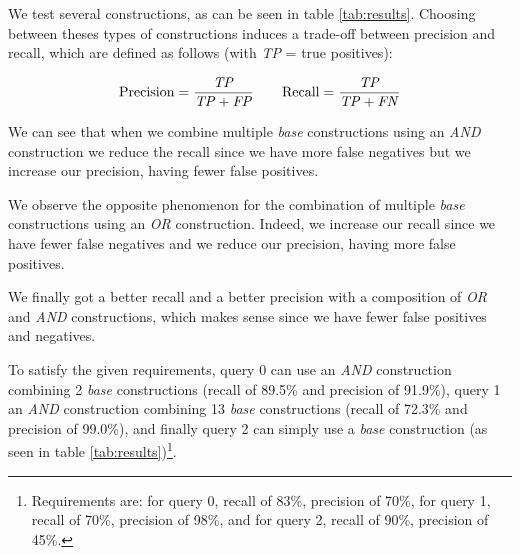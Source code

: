 \documentclass[a4paper,10pt]{IEEEtran}
\begin{document}
We test several constructions, as can be seen in table \ref{tab:results}.
Choosing between theses types of constructions induces a trade-off between precision and recall, which are defined as follows (with \textit{TP} = true positives):

\[
    \textrm{Precision} = \frac{\textrm{\textit{TP}}}{\textrm{\textit{TP}} + \textrm{\textit{FP}}} \quad\quad
    \textrm{Recall} = \frac{\textrm{\textit{TP}}}{\textrm{\textit{TP}} + \textrm{\textit{FN}}}
\]

We can see that when we combine multiple \textit{base} constructions using an \textit{AND} construction we reduce the recall since we have more false negatives but we increase our precision, having fewer false positives.

We observe the opposite phenomenon for the combination of multiple \textit{base} constructions using an \textit{OR} construction.
Indeed, we increase our recall since we have fewer false negatives and we reduce our precision, having more false positives.

We finally got a better recall and a better precision with a composition of \textit{OR} and \textit{AND} constructions, which makes sense since we have fewer false positives and negatives.

To satisfy the given requirements, query 0 can use an \textit{AND} construction combining 2 \textit{base} constructions (recall of 89.5\% and precision of 91.9\%), query 1 an \textit{AND} construction combining 13 \textit{base} constructions (recall of 72.3\% and precision of 99.0\%), and finally query 2 can simply use a \textit{base} construction (as seen in table \ref{tab:results})\footnote{Requirements are: for query 0, recall of 83\%, precision of 70\%, for query 1, recall of 70\%, precision of 98\%, and for query 2, recall of 90\%, precision of 45\%.}.
\end{document}
